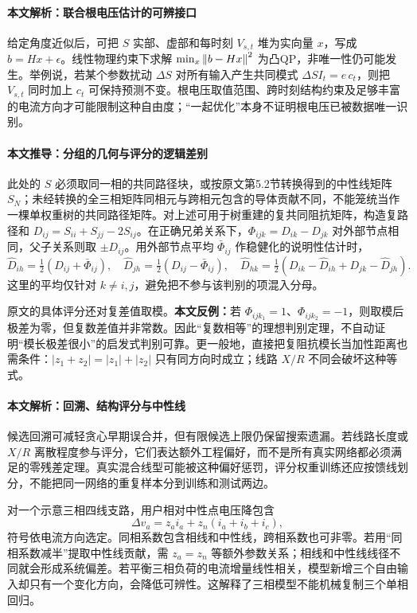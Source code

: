 \paragraph{本文解析：联合根电压估计的可辨接口}
给定角度近似后，可把 $S$ 实部、虚部和每时刻 $V_{s,t}$ 堆为实向量 $x$，写成 $b=Hx+\epsilon$。线性物理约束下求解 $\min_x\left\lVert b-Hx\right\rVert^2$ 为凸QP，非唯一性仍可能发生。举例说，若某个参数扰动 $\Delta S$ 对所有输入产生共同模式 $\Delta S I_t=e\,c_t$，则把 $V_{s,t}$ 同时加上 $c_t$ 可保持预测不变。根电压取值范围、跨时刻结构约束及足够丰富的电流方向才可能限制这种自由度；“一起优化”本身不证明根电压已被数据唯一识别。

\paragraph{本文推导：分组的几何与评分的逻辑差别}
此处的 $S$ 必须取同一相的共同路径块，或按原文第5.2节转换得到的中性线矩阵 $S_N$；未经转换的全三相矩阵同相元与跨相元包含的导体贡献不同，不能笼统当作一棵单权重树的共同路径矩阵。对上述可用于树重建的复共同阻抗矩阵，构造复路径和 $D_{ij}=S_{ii}+S_{jj}-2S_{ij}$。在正确兄弟关系下，$\Phi_{ijk}=D_{ik}-D_{jk}$ 对外部节点相同，父子关系则取 $\pm D_{ij}$。用外部节点平均 $\bar\Phi_{ij}$ 作稳健化的说明性估计时，
\begin{equation}
 \widehat D_{ih}=\tfrac12(D_{ij}+\bar\Phi_{ij}),\quad
 \widehat D_{jh}=\tfrac12(D_{ij}-\bar\Phi_{ij}),\quad
 \widehat D_{hk}=\tfrac12(D_{ik}-\widehat D_{ih}+D_{jk}-\widehat D_{jh}).
\end{equation}
这里的平均仅针对 $k\ne i,j$，避免把不参与该判别的项混入分母。

原文的具体评分还对复差值取模。\textbf{本文反例：}若 $\Phi_{ijk_1}=1$、$\Phi_{ijk_2}=-1$，则取模后极差为零，但复数差值并非常数。因此“复数相等”的理想判别定理，不自动证明“模长极差很小”的启发式判别可靠。更一般地，直接把复阻抗模长当加性距离也需条件：$|z_1+z_2|=|z_1|+|z_2|$ 只有同方向时成立；线路 $X/R$ 不同会破坏这种等式。

\paragraph{本文解析：回溯、结构评分与中性线}
候选回溯可减轻贪心早期误合并，但有限候选上限仍保留搜索遗漏。若线路长度或 $X/R$ 离散程度参与评分，它们表达额外工程偏好，而不是所有真实网络都必须满足的零残差定理。真实混合线型可能被这种偏好惩罚，评分权重训练还应按馈线划分，不能把同一网络的重复样本分到训练和测试两边。

对一个示意三相四线支路，用户相对中性点电压降包含
\begin{equation}
 \Delta v_a=z_a i_a+z_n(i_a+i_b+i_c),
\end{equation}
符号依电流方向选定。同相系数包含相线和中性线，跨相系数也可非零。若用“同相系数减半”提取中性线贡献，需 $z_a=z_n$ 等额外参数关系；相线和中性线线径不同就会形成系统偏差。若平衡三相负荷的电流增量线性相关，模型新增三个自由输入却只有一个变化方向，会降低可辨性。这解释了三相模型不能机械复制三个单相回归。

